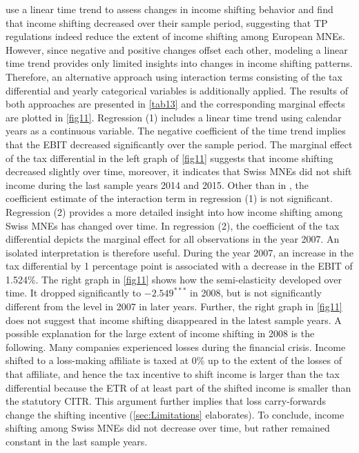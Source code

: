 \documentclass[10pt,twocolumn,oneside,cmyk]{article}
\begin{document}
\textcite[10, 23]{lohse_impact_2012} use a linear time trend to assess changes in income shifting behavior and find that income shifting decreased over their sample period, suggesting that TP regulations indeed reduce the extent of income shifting among European MNEs. However, since negative and positive changes offset each other, modeling a linear time trend provides only limited insights into changes in income shifting patterns. Therefore, an alternative approach using interaction terms consisting of the tax differential and yearly categorical variables is additionally applied. The results of both approaches are presented in \cref{tab13} and the corresponding marginal effects are plotted in \cref{fig11}. Regression (1) includes a linear time trend using calendar years as a continuous variable. The negative coefficient of the time trend implies that the EBIT decreased significantly over the sample period. The marginal effect of the tax differential in the left graph of \cref{fig11} suggests that income shifting decreased slightly over time, moreover, it indicates that Swiss MNEs did not shift income during the last sample years 2014 and 2015. Other than in \textcite[10]{lohse_impact_2012}, the coefficient estimate of the interaction term in regression (1) is not significant. Regression (2) provides a more detailed insight into how income shifting among Swiss MNEs has changed over time. In regression (2), the coefficient of the tax differential depicts the marginal effect for all observations in the year 2007. An isolated interpretation is therefore useful. During the year 2007, an increase in the tax differential by 1 percentage point is associated with a decrease in the EBIT of 1.524\%. The right graph in \cref{fig11} shows how the semi-elasticity developed over time. It dropped significantly to $-2.549^{***}$ in 2008, but is not significantly different from the level in 2007 in later years. Further, the right graph in \cref{fig11} does not suggest that income shifting disappeared in the latest sample years. A possible explanation for the large extent of income shifting in 2008 is the following. Many companies experienced losses during the financial crisis. Income shifted to a loss-making affiliate is taxed at 0\% up to the extent of the losses of that affiliate, and hence the tax incentive to shift income is larger than the tax differential because the ETR of at least part of the shifted income is smaller than the statutory CITR. This argument further implies that loss carry-forwards change the shifting incentive \parencite[9-10]{overesch_effects_2009} (\cref{sec:Limitations} elaborates). To conclude, income shifting among Swiss MNEs did not decrease over time, but rather remained constant in the last sample years.
\end{document}
